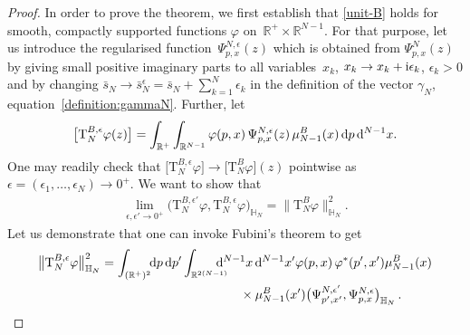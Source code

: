 \documentclass[pdftex]{sigma}%
\numberwithin{equation}{section}
\begin{document}
\begin{proof}
In order to prove the theorem, we first establish that \eqref{unit-B} holds for smooth, compactly supported functions $\varphi$ on~$\mathbb{R}^+\times \mathbb{R}^{N-1}$. For that purpose, let us introduce the regularised function~$\Psi^{N,\epsilon}_{p,{x}}({z})$ which
is obtained from $\Psi^{N}_{p,{x}}({z})$ by giving small positive imaginary parts to all variables~$x_k$, $x_k\to x_k+{\rm i}\epsilon_k$,
$\epsilon_k>0$ and by changing $\bar s_N\to \bar s^{\epsilon}_N=\bar s_N+\sum_{k=1}^N \epsilon_k$ in the definition of the vector
$\gamma_N$, equation~\eqref{definition:gammaN}. Further, let
\begin{gather*}
\big[ \mathrm T_{N}^{B,\epsilon}\varphi( z)\big]
=\int_{\mathbb R^+} \int_{\mathbb R^{N-1}} \varphi(p, x)\,
 \Psi^{N,\epsilon}_{p,{x}}({z})\, \mu_{N-1}^{B}( x)\, {\rm d}p\, {\rm d}^{N-1} x.
\end{gather*}
One may readily check that $\big[ \mathrm T_{N}^{B,\epsilon}\varphi\big] \rightarrow\big[ \mathrm T_{N}^{B}\varphi\big]( z)$ pointwise as $\epsilon
=(\epsilon_1,\dots, \epsilon_N)\rightarrow 0^+$. We want to show that
\begin{gather*}
\lim_{\epsilon, \epsilon' \rightarrow 0^+} \big( \mathrm T_{N}^{B,\epsilon'} \varphi,
\mathrm T_{N}^{B,\epsilon}\varphi \big)_{\mathbb H_N} = \big\|\mathrm T_{N}^{B}\varphi\big\|_{\mathbb H_N}^2.
\end{gather*}
Let us demonstrate that one can invoke Fubini's theorem to get
\begin{gather*}
\big\|\mathrm T_{N}^{B,\epsilon}\varphi\big\|_{\mathbb H_N}^2
= \int_{(\mathbb R^+)^2}\!\!{\rm d}p\, {\rm d}p^{\prime} \int_{\mathbb R^{2(N-1)} }
\hspace{-4mm} {\rm d}^{N-1} x\, {\rm d}^{N-1} {x}' \varphi(p, x)\,\varphi^*(p', {x}')\mu_{N-1}^{B}( x)
\\ \hphantom{\big\|\mathrm T_{N}^{B,\epsilon}\varphi\big\|_{\mathbb H_N}^2
= \int_{(\mathbb R^+)^2}\!\!{\rm d}p\, {\rm d}p^{\prime} \int\quad}
{}\times \mu_{N-1}^{B}( {x}') \big(\Psi^{N,\epsilon'}_{p',{x}'},\Psi^{N,\epsilon}_{p,{x}}\big)_{\mathbb H_N} \, .
\end{gather*}



\end{proof}
\end{document}
